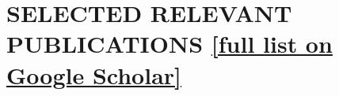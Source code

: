 \documentclass[paper=letter,fontsize=11pt]{scrartcl} %
\newcommand{\NewPart}[2]{\section*{\uppercase{#1} #2}}
\begin{document}

\NewPart{Selected Relevant Publications}{\href{https://scholar.google.ch/citations?user=wZ9f8CAAAAAJ}{[full list on Google Scholar]}}
\end{document}

